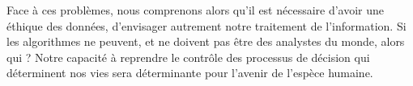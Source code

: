 \documentclass[a4paper,14pt]{extreport}
\begin{document}
Face à ces problèmes, nous comprenons alors qu'il est nécessaire d'avoir une éthique des données, d'envisager autrement notre traitement de l'information. Si les algorithmes ne peuvent, et ne doivent pas être des analystes du monde, alors qui ? Notre capacité à reprendre le contrôle des processus de décision qui déterminent nos vies sera déterminante pour l'avenir de l'espèce humaine.

\nocite{benjamin}



\end{document}
